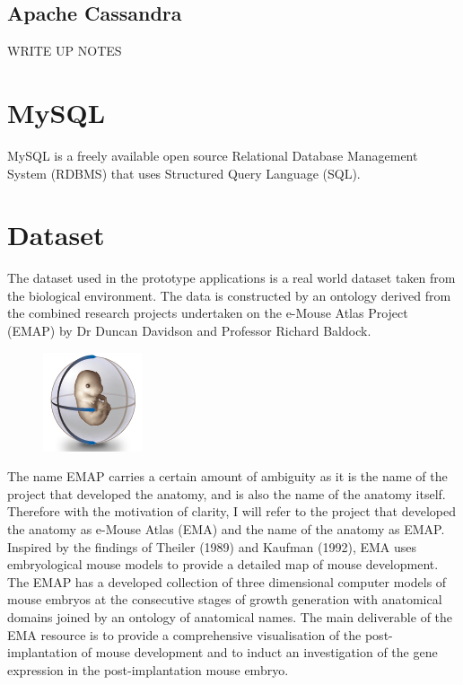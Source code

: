 \subsection{Apache Cassandra}\label{cassandra}
WRITE UP NOTES

\section{MySQL}\label{mysql}
MySQL is a freely available open source Relational Database Management System (RDBMS) that uses Structured Query Language (SQL).

\section{Dataset}
The dataset used in the prototype applications is a real world dataset taken from the biological environment. The data is constructed by an ontology derived from the combined research projects undertaken on the e-Mouse Atlas Project (EMAP) by Dr Duncan Davidson and Professor Richard Baldock.\begin{figure}\includegraphics[width=0.9\linewidth]{images/ema_logo}\end{figure} The name EMAP carries a certain amount of ambiguity as it is the name of the project that developed the anatomy, and is also the name of the anatomy itself. Therefore with the motivation of clarity, I will refer to the project that developed the anatomy as e-Mouse Atlas (EMA) and the name of the anatomy as EMAP. Inspired by the findings of Theiler (1989) and Kaufman (1992), EMA uses embryological mouse models to provide a detailed map of mouse development. The EMAP has a developed collection of three dimensional computer models of mouse embryos at the consecutive stages of growth generation with anatomical domains joined by an ontology of anatomical names. The main deliverable of the EMA resource is to provide a comprehensive visualisation of the post-implantation of mouse development and to induct an investigation of the gene expression in the post-implantation mouse embryo.
